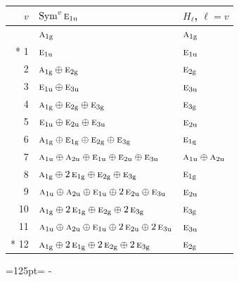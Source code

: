 \documentclass[10pt,a4paper]{article}
\newcommand{\needspace}[1]{\par\penalty-100\begingroup\dimen0=#1\relax\dimen2=\pagegoal
  \advance\dimen2-\pagetotal\ifdim\dimen0>\dimen2\relax\ifdim\dimen2>0pt\vfil\break\fi\fi
  \endgroup}
\numberwithin{equation}{section}
\newcommand{\irr}[1]{\text{\normalfont\scshape #1}}
\newcommand{\ptag}[1]{\mathrm{#1}}
\begin{document}
{\small\begin{longtable}{@{}rll@{}}\toprule
$v$ & $\operatorname{Sym}^{v}\irr{e}_{1\ptag{u}}$ & $H_\ell$, $\ell = v$\\\midrule\endhead
\bottomrule\endfoot\endlastfoot
0 & $\irr{a}_{1\ptag{g}}$ & $\irr{a}_{1\ptag{g}}$\\*
1 & $\irr{e}_{1\ptag{u}}$ & $\irr{e}_{1\ptag{u}}$\\
2 & $\irr{a}_{1\ptag{g}} \oplus \irr{e}_{2\ptag{g}}$ & $\irr{e}_{2\ptag{g}}$\\
3 & $\irr{e}_{1\ptag{u}} \oplus \irr{e}_{3\ptag{u}}$ & $\irr{e}_{3\ptag{u}}$\\
4 & $\irr{a}_{1\ptag{g}} \oplus \irr{e}_{2\ptag{g}} \oplus \irr{e}_{3\ptag{g}}$ & $\irr{e}_{3\ptag{g}}$\\
5 & $\irr{e}_{1\ptag{u}} \oplus \irr{e}_{2\ptag{u}} \oplus \irr{e}_{3\ptag{u}}$ & $\irr{e}_{2\ptag{u}}$\\
6 & $\irr{a}_{1\ptag{g}} \oplus \irr{e}_{1\ptag{g}} \oplus \irr{e}_{2\ptag{g}} \oplus \irr{e}_{3\ptag{g}}$ & $\irr{e}_{1\ptag{g}}$\\
7 & $\irr{a}_{1\ptag{u}} \oplus \irr{a}_{2\ptag{u}} \oplus \irr{e}_{1\ptag{u}} \oplus \irr{e}_{2\ptag{u}} \oplus \irr{e}_{3\ptag{u}}$ & $\irr{a}_{1\ptag{u}} \oplus \irr{a}_{2\ptag{u}}$\\
8 & $\irr{a}_{1\ptag{g}} \oplus 2\,\irr{e}_{1\ptag{g}} \oplus \irr{e}_{2\ptag{g}} \oplus \irr{e}_{3\ptag{g}}$ & $\irr{e}_{1\ptag{g}}$\\
9 & $\irr{a}_{1\ptag{u}} \oplus \irr{a}_{2\ptag{u}} \oplus \irr{e}_{1\ptag{u}} \oplus 2\,\irr{e}_{2\ptag{u}} \oplus \irr{e}_{3\ptag{u}}$ & $\irr{e}_{2\ptag{u}}$\\
10 & $\irr{a}_{1\ptag{g}} \oplus 2\,\irr{e}_{1\ptag{g}} \oplus \irr{e}_{2\ptag{g}} \oplus 2\,\irr{e}_{3\ptag{g}}$ & $\irr{e}_{3\ptag{g}}$\\
11 & $\irr{a}_{1\ptag{u}} \oplus \irr{a}_{2\ptag{u}} \oplus \irr{e}_{1\ptag{u}} \oplus 2\,\irr{e}_{2\ptag{u}} \oplus 2\,\irr{e}_{3\ptag{u}}$ & $\irr{e}_{3\ptag{u}}$\\*
12 & $\irr{a}_{1\ptag{g}} \oplus 2\,\irr{e}_{1\ptag{g}} \oplus 2\,\irr{e}_{2\ptag{g}} \oplus 2\,\irr{e}_{3\ptag{g}}$ & $\irr{e}_{2\ptag{g}}$\\
\bottomrule\end{longtable}}
\needspace{125pt}
\end{document}
